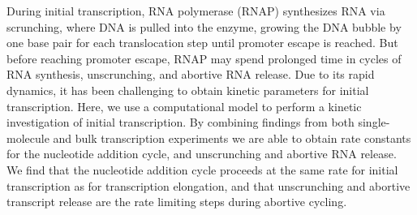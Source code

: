 During initial transcription, RNA polymerase (RNAP) synthesizes RNA via
scrunching, where DNA is pulled into the enzyme, growing the DNA bubble by one
base pair for each translocation step until promoter escape is reached. But
before reaching promoter escape, RNAP may spend prolonged time in
cycles of RNA synthesis, unscrunching, and abortive RNA release. Due to its
rapid dynamics, it has been challenging to obtain kinetic parameters for
initial transcription. Here, we use a computational model to perform a kinetic
investigation of initial transcription. By combining findings from both
single-molecule and bulk transcription experiments we are able to obtain rate
constants for the nucleotide addition cycle, and unscrunching and abortive RNA
release. We find that the nucleotide addition cycle proceeds at the same rate
for initial transcription as for transcription elongation, and that
unscrunching and abortive transcript release are the rate limiting steps
during abortive cycling.
